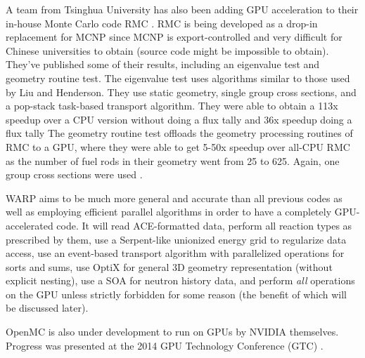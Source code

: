 A team from Tsinghua University has also been adding GPU acceleration to their in-house Monte Carlo code RMC \cite{qixu}. RMC is being developed as a drop-in replacement for MCNP since MCNP is export-controlled and very difficult for Chinese universities to obtain (source code might be impossible to obtain).  They've published some of their results, including an eigenvalue test and geometry routine test.  The eigenvalue test uses algorithms similar to those used by Liu and Henderson.  They use static geometry, single group cross sections, and a pop-stack task-based transport algorithm.  They were able to obtain a 113x speedup over a CPU version without doing a flux tally and 36x speedup doing a flux tally \cite{qixu_ans_winter}   The geometry routine test offloads the geometry processing routines of RMC to a GPU, where they were able to get 5-50x speedup over all-CPU RMC as the number of fuel rods in their geometry went from 25 to 625.  Again, one group cross sections were used \cite{qixu}.

WARP aims to be much more general and accurate than all previous codes as well as employing efficient parallel algorithms in order to have a completely GPU-accelerated code.  It will read ACE-formatted data, perform all reaction types as prescribed by them, use a Serpent-like unionized energy grid to regularize data access, use an event-based transport algorithm with parallelized operations for sorts and sums, use OptiX for general 3D geometry representation (without explicit nesting), use a SOA for neutron history data, and perform \emph{all} operations on the GPU unless strictly forbidden for some reason (the benefit of which will be discussed later).
	
OpenMC is also under development to run on GPUs by NVIDIA themselves.  Progress was presented at the 2014 GPU Technology Conference (GTC) \cite{openmc_gtc}.

